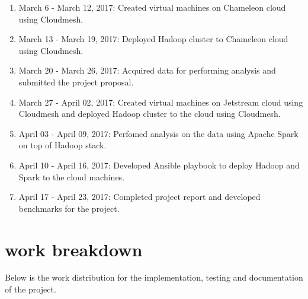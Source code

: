 \documentclass[9pt,twocolumn,twoside]{../../styles/osajnl}
\begin{document}
\begin{enumerate}

\item {March 6 - March 12, 2017: } Created virtual machines on Chameleon
  cloud using Cloudmesh.
  
\item {March 13 - March 19, 2017: } Deployed Hadoop cluster to Chameleon
  cloud using Cloudmesh.

\item {March 20 - March 26, 2017: } Acquired data for performing
  analysis and submitted the project proposal.

\item {March 27 - April 02, 2017: } Created virtual machines on
  Jetstream cloud using Cloudmesh and deployed Hadoop cluster to the
  cloud using Cloudmesh.

\item {April 03 - April 09, 2017: } Perfomed analysis on the data using
  Apache Spark on top of Hadoop stack.
  
\item {April 10 - April 16, 2017: } Developed Ansible playbook to deploy
  Hadoop and Spark to the cloud machines. 

\item {April 17 - April 23, 2017: } Completed project report and developed
  benchmarks for the project.

\end{enumerate}


\section{work breakdown} 

Below is the work distribution for the implementation, testing and documentation of the project.
\end{document}
